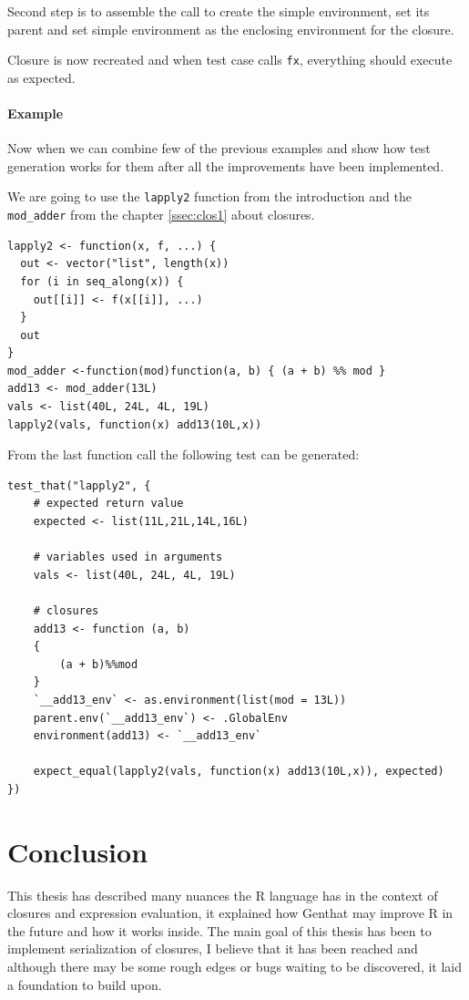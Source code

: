\documentclass[thesis=B,english]{FITthesis}[2012/10/20]
\begin{document}
Second step is to assemble the call to create the simple environment, set its parent and set simple environment as the enclosing environment for the closure.

Closure is now recreated and when test case calls \verb|fx|, everything should execute as expected.

\subsubsection{Example}
Now when we can combine few of the previous examples and show how test generation works for them after all the improvements have been implemented. 

We are going to use the \verb|lapply2| function from the introduction and the \verb|mod_adder| from the chapter \ref{ssec:clos1} about closures.

\begin{verbatim}
lapply2 <- function(x, f, ...) {
  out <- vector("list", length(x))
  for (i in seq_along(x)) {
    out[[i]] <- f(x[[i]], ...)
  }
  out
}
mod_adder <-function(mod)function(a, b) { (a + b) %% mod }
add13 <- mod_adder(13L)
vals <- list(40L, 24L, 4L, 19L)  
lapply2(vals, function(x) add13(10L,x))
\end{verbatim}

From the last function call the following test can be generated:

\begin{verbatim}
test_that("lapply2", {                   
    # expected return value   
    expected <- list(11L,21L,14L,16L)        
    
    # variables used in arguments                     
    vals <- list(40L, 24L, 4L, 19L)
    
    # closures                     
    add13 <- function (a, b)
    {
        (a + b)%%mod
    }
    `__add13_env` <- as.environment(list(mod = 13L))
    parent.env(`__add13_env`) <- .GlobalEnv
    environment(add13) <- `__add13_env`
    
    expect_equal(lapply2(vals, function(x) add13(10L,x)), expected)
})                               
\end{verbatim}

\chapter{Conclusion}
This thesis has described many nuances the R language has in the context of closures and expression evaluation, it explained how Genthat may improve R in the future and how it works inside. The main goal of this thesis has been to implement serialization of closures, I believe that it has been reached and although there may be some rough edges or bugs waiting to be discovered, it laid a foundation to build upon. 
\end{document}
